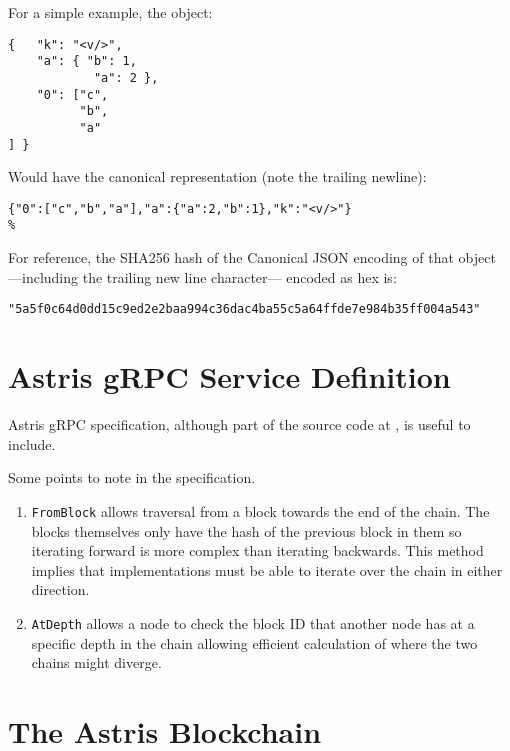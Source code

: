For a simple example, the object:

\newpage
\begin{lstlisting}[style=ES6]
{   "k": "<v/>",
    "a": { "b": 1,
            "a": 2 },
    "0": ["c",
          "b",
          "a"
] }
\end{lstlisting}

Would have the canonical representation (note the trailing newline):

\begin{lstlisting}[style=ES6,escapechar=\%]
{"0":["c","b","a"],"a":{"a":2,"b":1},"k":"<v/>"}
%
\end{lstlisting}

For reference, the SHA256 hash of the Canonical JSON encoding of that object ---including the trailing new line character--- encoded as hex is:

\begin{lstlisting}[style=ES6]
"5a5f0c64d0dd15c9ed2e2baa994c36dac4ba55c5a64ffde7e984b35ff004a543"
\end{lstlisting}

\chapter{Astris gRPC Service Definition}
\label{appendix:grpc}

Astris gRPC specification, although part of the source code at {\surl{\astrisrepo}}, is useful to include.



Some points to note in the specification.

\begin{enumerate}
    \item \texttt{FromBlock} allows traversal from a block towards the end of the chain. The blocks themselves only have the hash of the previous block in them so iterating forward is more complex than iterating backwards. This method implies that implementations must be able to iterate over the chain in either direction.
    \item \texttt{AtDepth} allows a node to check the block ID that another node has at a specific depth in the chain allowing efficient calculation of where the two chains might diverge.
\end{enumerate}

\chapter{The Astris Blockchain}
\label{appendix:blockchain}

